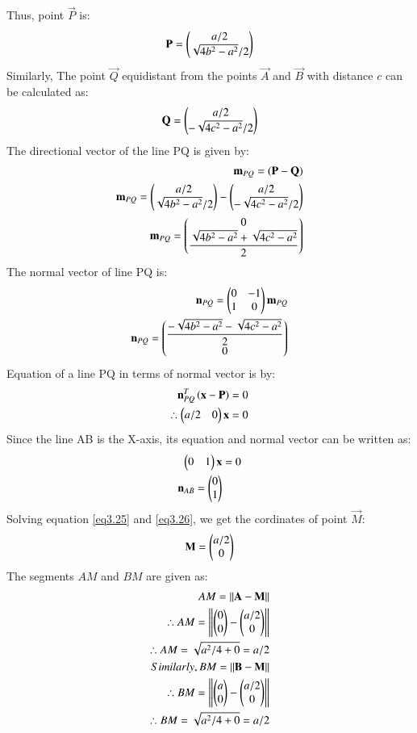 \documentclass[journal,12pt,twocolumn]{IEEEtran}
\begin{document}
Thus, point $\vec{P}$ is:
\begin{align}
    \mathbf{P}=\begin{pmatrix}a/2\\\sqrt{4b^2-a^2}/2\end{pmatrix}\\
\end{align}
Similarly, The point $\vec{Q}$ equidistant from the points $\vec{A}$ and $\vec{B}$ with distance $c$ can be calculated as:
\begin{align}
    \mathbf{Q}=\begin{pmatrix}a/2\\-\sqrt{4c^2-a^2}/2\end{pmatrix}
\end{align}
The directional vector of the line PQ is given by:
\begin{align}
    \mathbf{m}_{PQ}=(\mathbf{P}-\mathbf{Q})\\
    \mathbf{m}_{PQ}=\begin{pmatrix}a/2\\\sqrt{4b^2-a^2}/2\end{pmatrix}-\begin{pmatrix}a/2\\-\sqrt{4c^2-a^2}/2\end{pmatrix}\\
    \mathbf{m}_{PQ}=\begin{pmatrix}0\\\displaystyle \frac{\sqrt{4b^2-a^2}+\sqrt{4c^2-a^2}}{2}\end{pmatrix}
\end{align}
The normal vector of line PQ is:
\begin{align}
    \mathbf{n}_{PQ} = \begin{pmatrix}0&-1\\1&0\end{pmatrix}\mathbf{m}_{PQ} \\
    \mathbf{n}_{PQ} = \begin{pmatrix}\displaystyle \frac{-\sqrt{4b^2-a^2}-\sqrt{4c^2-a^2}}{2}\\0\end{pmatrix} \label{eq3.23}
\end{align}
Equation of a line PQ in terms of normal vector is by:
\begin{align}
\mathbf{n}_{PQ}^T\left(\mathbf{x}-\mathbf{P}\right) &= 0\\
\therefore \begin{pmatrix}a/2 & 0\end{pmatrix} \mathbf{x} &= 0 \label{eq3.25}
\end{align}
Since the line AB is the X-axis, its equation and normal vector can be written as:
\begin{align}
\begin{pmatrix}0 & 1\end{pmatrix} \mathbf{x} &= 0 \label{eq3.26}\\
\mathbf{n}_{AB}=\begin{pmatrix}0\\1\end{pmatrix} \label{eq3.27}
\end{align}
Solving equation \ref{eq3.25} and \ref{eq3.26}, we get the cordinates of point $\vec{M}$:
\begin{align}
    \mathbf{M}=\begin{pmatrix}a/2\\0\end{pmatrix}
\end{align}
The segments $AM$ and $BM$ are given as:
\begin{align}
    AM=\left\lVert\mathbf{A}-\mathbf{M}\right\rVert \\
    \therefore AM=\left\lVert\begin{pmatrix}0\\0\end{pmatrix}-\begin{pmatrix}a/2\\0\end{pmatrix}\right\rVert\\
    \therefore AM=\sqrt{a^2/4+0}=a/2 \label{eq3.30}\\
    Similarly,BM=\left\lVert\mathbf{B}-\mathbf{M}\right\rVert \\
    \therefore BM=\left\lVert\begin{pmatrix}a\\0\end{pmatrix}-\begin{pmatrix}a/2\\0\end{pmatrix}\right\rVert\\
    \therefore BM=\sqrt{a^2/4+0}=a/2\label{eq3.33}
\end{align}
\end{document}
